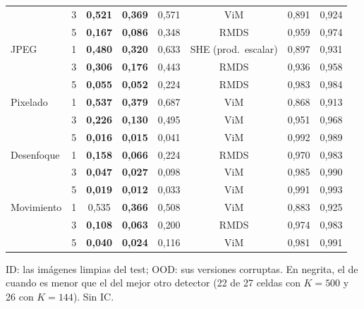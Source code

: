 \begin{table}
\begin{tabular*}{\linewidth}{@{\extracolsep{\fill}}llcccccc}
 & 3 & \textbf{0{,}521} & \textbf{0{,}369} & 0{,}571 & ViM & 0{,}891 & 0{,}924 \\
 & 5 & \textbf{0{,}167} & \textbf{0{,}086} & 0{,}348 & RMDS & 0{,}959 & 0{,}974 \\
\midrule
JPEG & 1 & \textbf{0{,}480} & \textbf{0{,}320} & 0{,}633 & SHE (prod.\ escalar) & 0{,}897 & 0{,}931 \\
 & 3 & \textbf{0{,}306} & \textbf{0{,}176} & 0{,}443 & RMDS & 0{,}936 & 0{,}958 \\
 & 5 & \textbf{0{,}055} & \textbf{0{,}052} & 0{,}224 & RMDS & 0{,}983 & 0{,}984 \\
\midrule
Pixelado & 1 & \textbf{0{,}537} & \textbf{0{,}379} & 0{,}687 & ViM & 0{,}868 & 0{,}913 \\
 & 3 & \textbf{0{,}226} & \textbf{0{,}130} & 0{,}495 & ViM & 0{,}951 & 0{,}968 \\
 & 5 & \textbf{0{,}016} & \textbf{0{,}015} & 0{,}041 & ViM & 0{,}992 & 0{,}989 \\
\midrule
Desenfoque & 1 & \textbf{0{,}158} & \textbf{0{,}066} & 0{,}224 & RMDS & 0{,}970 & 0{,}983 \\
 & 3 & \textbf{0{,}047} & \textbf{0{,}027} & 0{,}098 & ViM & 0{,}985 & 0{,}990 \\
 & 5 & \textbf{0{,}019} & \textbf{0{,}012} & 0{,}033 & ViM & 0{,}991 & 0{,}993 \\
\midrule
Movimiento & 1 & 0{,}535 & \textbf{0{,}366} & 0{,}508 & ViM & 0{,}883 & 0{,}925 \\
 & 3 & \textbf{0{,}108} & \textbf{0{,}063} & 0{,}200 & RMDS & 0{,}974 & 0{,}983 \\
 & 5 & \textbf{0{,}040} & \textbf{0{,}024} & 0{,}116 & ViM & 0{,}981 & 0{,}991 \\
\bottomrule
\end{tabular*}

\smallskip
\parbox{\linewidth}{\scriptsize ID: las imágenes limpias del test; OOD: sus versiones corruptas. En negrita, el  de \stoodx cuando es menor que el del mejor otro detector (22 de 27 celdas con $K=500$ y 26 con $K=144$). Sin IC.}
\end{table}
